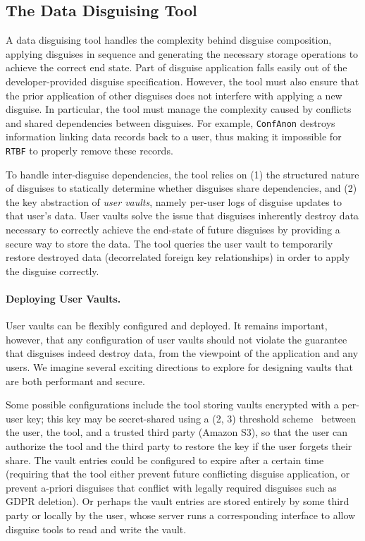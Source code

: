 \subsection{The Data Disguising Tool}
\label{sec:composition}
A data disguising tool handles the complexity behind disguise composition, applying disguises in
sequence and generating the necessary storage operations to achieve the correct end state. 
%
Part of disguise application falls easily out of the developer-provided disguise
specification. However, the tool must also ensure that the prior application of other disguises does
not interfere with applying a new disguise. In particular, the tool must manage the complexity
caused by conflicts and shared dependencies between disguises. 
For example, \texttt{ConfAnon} destroys information linking data records back to a
user, thus making it impossible for \texttt{RTBF} to properly remove these records. 

To handle inter-disguise dependencies, the tool relies on (1) the structured nature of disguises to
statically determine whether disguises share dependencies, and (2) the key abstraction of \emph{user
vaults}, namely per-user logs of disguise updates to that user's data.  User vaults solve the issue
that disguises inherently destroy data necessary to correctly achieve the end-state of future
disguises by providing a secure way to store the data. The tool queries the user vault to
temporarily restore destroyed data (\eg decorrelated foreign key relationships) in order to apply
the disguise correctly.

\paragraph{Deploying User Vaults.}
User vaults can be flexibly configured and deployed. It remains important, however, that any
configuration of user vaults should not violate the guarantee that disguises indeed destroy data,
from the viewpoint of the application and any users. 
We imagine several exciting directions to explore for designing vaults that are both
performant and secure.
%

%
Some possible configurations include the tool storing vaults encrypted with a per-user key; this key
may be secret-shared using a (2, 3) threshold scheme~\cite{secretsharing} between the user, the
tool, and a trusted third party (\eg Amazon S3), so that the user can authorize the tool and the
third party to restore the key if the user forgets their share. 
%
The vault entries could be configured to expire after a certain time (requiring that the tool either
prevent future conflicting disguise application, or prevent a-priori disguises that conflict with
legally required disguises such as GDPR deletion). 
%
Or perhaps the vault entries are stored entirely by some third party or locally by the user, whose
server runs a corresponding interface to allow disguise tools to read and write the vault.

